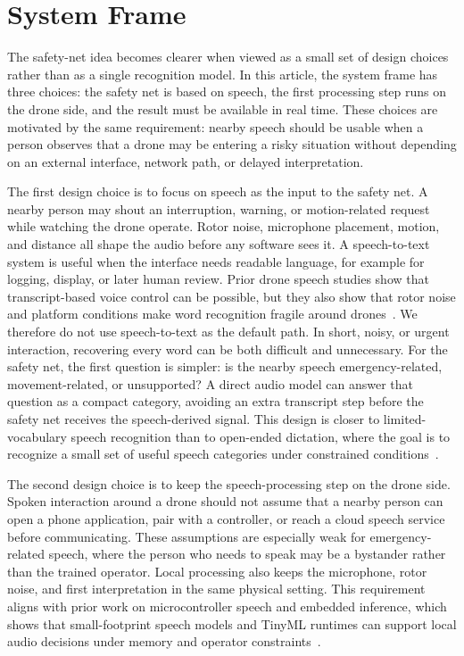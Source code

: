 \section{System Frame}

The safety-net idea becomes clearer when viewed as a small set of design choices rather than as a single recognition model. In this article, the system frame has three choices: the safety net is based on speech, the first processing step runs on the drone side, and the result must be available in real time. These choices are motivated by the same requirement: nearby speech should be usable when a person observes that a drone may be entering a risky situation without depending on an external interface, network path, or delayed interpretation.

The first design choice is to focus on speech as the input to the safety net. A nearby person may shout an interruption, warning, or motion-related request while watching the drone operate. Rotor noise, microphone placement, motion, and distance all shape the audio before any software sees it. A speech-to-text system is useful when the interface needs readable language, for example for logging, display, or later human review. Prior drone speech studies show that transcript-based voice control can be possible, but they also show that rotor noise and platform conditions make word recognition fragile around drones~\cite{oneata19_interspeech,miesikowska2021uavnoise}. We therefore do not use speech-to-text as the default path. In short, noisy, or urgent interaction, recovering every word can be both difficult and unnecessary. For the safety net, the first question is simpler: is the nearby speech emergency-related, movement-related, or unsupported? A direct audio model can answer that question as a compact category, avoiding an extra transcript step before the safety net receives the speech-derived signal. This design is closer to limited-vocabulary speech recognition than to open-ended dictation, where the goal is to recognize a small set of useful speech categories under constrained conditions~\cite{warden2018speechcommands}.

The second design choice is to keep the speech-processing step on the drone side. Spoken interaction around a drone should not assume that a nearby person can open a phone application, pair with a controller, or reach a cloud speech service before communicating. These assumptions are especially weak for emergency-related speech, where the person who needs to speak may be a bystander rather than the trained operator. Local processing also keeps the microphone, rotor noise, and first interpretation in the same physical setting. This requirement aligns with prior work on microcontroller speech and embedded inference, which shows that small-footprint speech models and TinyML runtimes can support local audio decisions under memory and operator constraints~\cite{zhang2017helloedge,david2021tflm,lin2020mcunet,banbury2021mlperftiny}.

